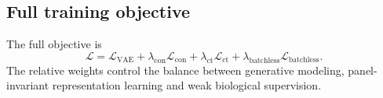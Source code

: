 \subsection{Full training objective}

The full objective is
\begin{equation}
    \mathcal{L}
    =
    \mathcal{L}_{\mathrm{VAE}}
    +
    \lambda_{\mathrm{con}}\mathcal{L}_{\mathrm{con}}
    +
    \lambda_{\mathrm{ct}}\mathcal{L}_{\mathrm{ct}}
    +
    \lambda_{\mathrm{batchless}}\mathcal{L}_{\mathrm{batchless}}.
\end{equation}
The relative weights control the balance between generative modeling, panel-invariant
representation learning and weak biological supervision.
